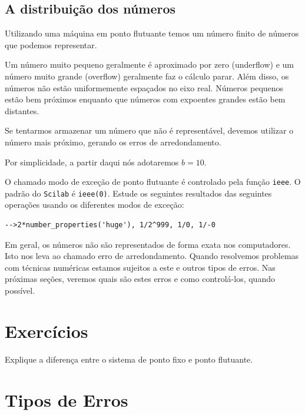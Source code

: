 \documentclass[main.tex]{subfiles}
\begin{document}
\subsection{A distribuição dos números}
Utilizando uma máquina em ponto flutuante temos um número finito de números que podemos representar.

Um número muito pequeno geralmente é aproximado por zero (underflow) e um número muito grande (overflow) geralmente faz o cálculo parar.
Além disso, os números não estão uniformemente espaçados no eixo real. Números pequenos estão bem próximos enquanto que números com expoentes grandes estão bem distantes.

Se tentarmos armazenar um número que não é representável, devemos utilizar o número mais próximo, gerando os erros de arredondamento.

Por simplicidade, a partir daqui nós adotaremos $b=10$.

\ifisscilab
\begin{obs}
  O chamado modo de exceção de ponto flutuante é controlado pela função \verb+ieee+. O padrão do \verb+Scilab+ é \verb+ieee(0)+. Estude os seguintes resultados das seguintes operações usando os diferentes modos de exceção:
\begin{verbatim}
-->2*number_properties('huge'), 1/2^999, 1/0, 1/-0
\end{verbatim}
\end{obs}
\fi

Em geral, os números não são representados de forma exata nos computadores. Isto nos leva ao chamado erro de arredondamento. Quando resolvemos problemas com técnicas numéricas estamos sujeitos a este e outros tipos de erros. Nas próximas seções, veremos quais são estes erros e como controlá-los, quando possível.

\section*{Exercícios}

\begin{Exercise} Explique a diferença entre o sistema de ponto fixo e ponto flutuante.
\end{Exercise}


\section{Tipos de Erros}
\end{document}
